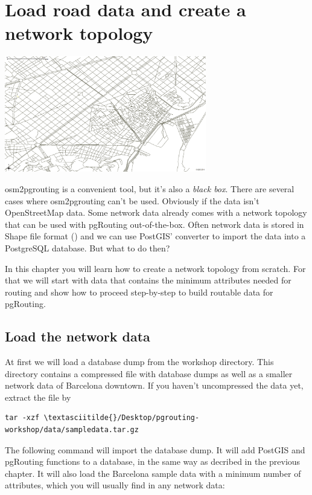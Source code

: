 \documentclass[a4paper,10pt,english]{manual}
\begin{document}
\resetcurrentobjects
\hypertarget{--doc-chapters/topology}{}

\chapter{Load road data and create a network topology}

{\hfill\includegraphics[width=250pt]{network.png}\hfill}

osm2pgrouting is a convenient tool, but it's also a \emph{black box}. There are several cases where osm2pgrouting can't be used. Obviously if the data isn't OpenStreetMap data. Some network data already comes with a network topology that can be used with pgRouting out-of-the-box. Often network data is stored in Shape file format () and we can use PostGIS'  converter to import the data into a PostgreSQL database. But what to do then?

In this chapter you will learn how to create a network topology from scratch. For that we will start with data that contains the minimum attributes needed for routing and show how to proceed step-by-step to build routable data for pgRouting.


\section{Load the network data}

At first we will load a database dump from the workshop  directory. This directory contains a compressed file with database dumps as well as a smaller network data of Barcelona downtown. If you haven't uncompressed the data yet, extract the file by

\begin{Verbatim}[commandchars=\\\{\}]
tar -xzf \textasciitilde{}/Desktop/pgrouting-workshop/data/sampledata.tar.gz
\end{Verbatim}

The following command will import the database dump. It will add PostGIS and pgRouting functions to a database, in the same way as decribed in the previous chapter. It will also load the Barcelona sample data with a minimum number of attributes, which you will usually find in any network data:
\end{document}
